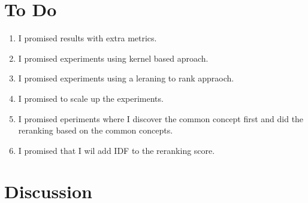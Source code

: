 \documentclass{article}
\begin{document}
\section{To Do}
\label{sec:todo}
\begin{enumerate}
\item I promised results with extra metrics.
\item I promised experiments using kernel based aproach.
\item I promised experiments using a leraning to rank appraoch.
\item I promised to scale up the experiments.
\item I promised eperiments where I discover the common concept first and did
  the reranking based on the common concepts.
\item I promised that I wil add IDF to the reranking score.
\end{enumerate}


\section{Discussion}
\label{sec:discussion}



\end{document}

